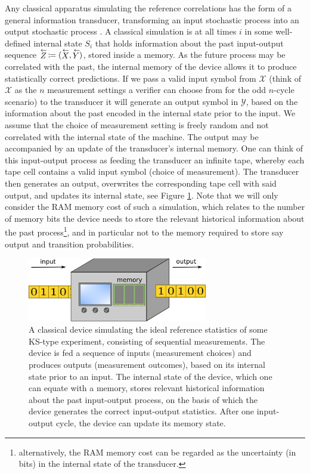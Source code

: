 Any classical apparatus simulating the reference correlations has the form of a general information transducer, transforming an input stochastic process into an output stochastic process \cite{Cabello2018}. A classical simulation is at all times $i$ in some well-defined internal state $S_i$ that holds information about the past input-output sequence $\oset{\leftarrow}{Z}\thinspace\coloneqq(\oset{\leftarrow}{X},\oset{\leftarrow}{Y})$, stored inside a memory. As the future process may be correlated with the past, the internal memory of the device allows it to produce statistically correct predictions. If we pass a valid input symbol from $\mathcal{X}$ (think of $\mathcal{X}$ as the $n$ measurement settings a verifier can choose from for the odd $n$-cycle scenario) to the transducer it will generate an output symbol in $\mathcal{Y}$, based on the information about the past encoded in the internal state prior to the input. We assume that the choice of measurement setting is freely random and not correlated with the internal state of the machine. The output may be accompanied by an update of the transducer's internal memory. One can think of this input-output process as feeding the transducer an infinite tape, whereby each tape cell contains a valid input symbol (choice of measurement). The transducer then generates an output, overwrites the corresponding tape cell with said output, and updates its internal state, see Figure \ref{fig:transducer}. Note that we will only consider the RAM memory cost of such a simulation, which relates to the number of memory bits the device needs to store the relevant historical information about the past process\footnote{alternatively, the RAM memory cost can be regarded as the uncertainty (in bits) in the internal state of the transducer.}, and in particular not to the memory required to store say output and transition probabilities.

\begin{figure}
    \centering
    \includegraphics[width=0.7\textwidth]{images/transducer.png}
    \caption{A classical device simulating the ideal reference statistics of some KS-type experiment, consisting of sequential measurements. The device is fed a sequence of inputs (measurement choices) and produces outputs (measurement outcomes), based on its internal state prior to an input. The internal state of the device, which one can equate with a memory, stores relevant historical information about the past input-output process, on the basis of which the device generates the correct input-output statistics. After one input-output cycle, the device can update its memory state.}
    \label{fig:transducer}
\end{figure}

